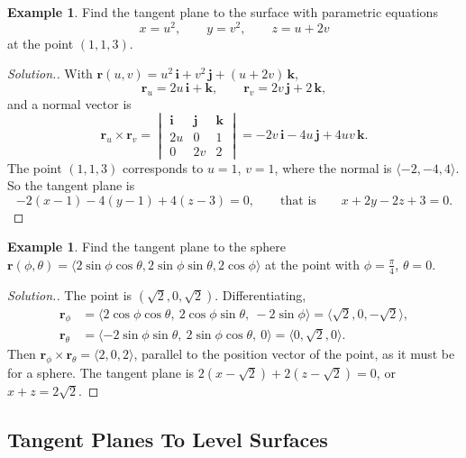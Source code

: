 \documentclass[11pt,a4paper]{article}
\theoremstyle{definition}
\newtheorem{exa}[thm]{Example}
\newenvironment{solution}
  {\renewcommand{\qedsymbol}{}\begin{proof}[\textit{Solution}.]}
  {\end{proof}}
\begin{document}
\begin{exa}
\label{ex:tangentparam}
Find the tangent plane to the surface with parametric equations
\[x =u^2 ,\qquad  y = v^2 , \qquad  z = u + 2v\]
at the point $(1,1,3)$.
\end{exa}

\begin{solution}
With $\mathbf r(u,v) = u^2 \,\mathbf i + v^2\,\mathbf j + (u + 2v)\,\mathbf k$,
\[\mathbf r_u = 2u\,\mathbf i + \mathbf k ,\qquad \mathbf r_v = 2v\,\mathbf j+
2\,\mathbf k ,\]
and a normal vector is
\[\mathbf r_u  \times \mathbf r_v = \begin{vmatrix}
\mathbf i & \mathbf j & \mathbf k\\
2u & 0 & 1\\
0 & 2v & 2
\end{vmatrix} = -2v\,\mathbf i -4u\,\mathbf j + 4uv\,\mathbf k .\]
The point $(1,1,3)$ corresponds to $u = 1$, $v = 1$, where the normal is
$\langle -2, -4, 4\rangle$. So the tangent plane is
\[-2(x-1) -4(y-1) + 4(z-3) =0,\qquad\text{that is}\qquad  x+ 2y -2z + 3 = 0 .\]
\end{solution}

\begin{exa}
\label{ex:tangentsphereparam}
Find the tangent plane to the sphere $\mathbf r(\phi,\theta) = \langle
2\sin\phi\cos\theta, 2\sin\phi\sin\theta, 2\cos\phi\rangle$ at the point with
$\phi = \frac{\pi}{4}$, $\theta = 0$.
\end{exa}

\begin{solution}
The point is $(\sqrt2, 0, \sqrt2)$. Differentiating,
\begin{align*}
\mathbf r_\phi & = \langle 2\cos\phi\cos\theta,\ 2\cos\phi\sin\theta,\
-2\sin\phi\rangle = \langle\sqrt2, 0, -\sqrt2\rangle,\\
\mathbf r_\theta & = \langle -2\sin\phi\sin\theta,\ 2\sin\phi\cos\theta,\
0\rangle = \langle 0, \sqrt2, 0\rangle .
\end{align*}
Then $\mathbf r_\phi\times\mathbf r_\theta = \langle 2, 0, 2\rangle$, parallel
to the position vector of the point, as it must be for a sphere. The tangent
plane is $2(x - \sqrt2) + 2(z - \sqrt2) = 0$, or $x + z = 2\sqrt2$.
\end{solution}

{\color[wave]{485}\subsection{Tangent Planes To Level Surfaces}}
\end{document}

